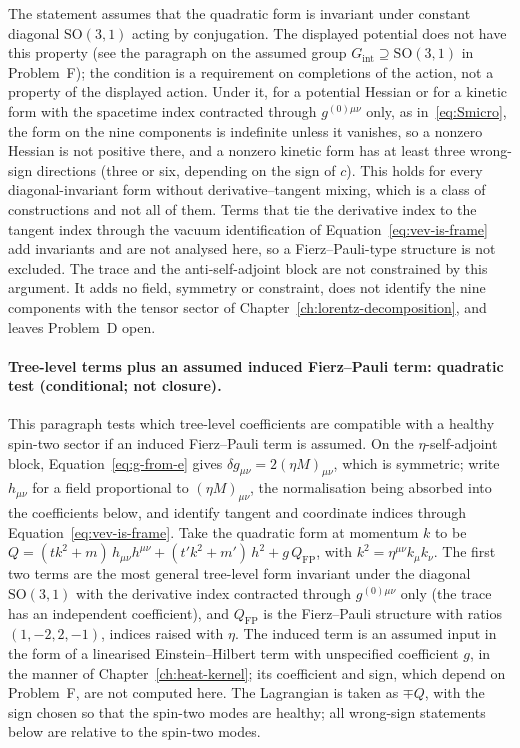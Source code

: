 The statement assumes that the quadratic form is invariant under constant
diagonal \(\mathrm{SO}(3,1)\) acting by conjugation.  The displayed
potential does not have this property (see the paragraph on the assumed
group \(G_{\mathrm{int}}\supseteq\mathrm{SO}(3,1)\) in Problem~F); the
condition is a requirement on completions of the action, not a property of
the displayed action.  Under it, for a potential Hessian or for a kinetic
form with the spacetime index contracted through \(g^{(0)\mu\nu}\) only, as
in~\eqref{eq:Smicro}, the form on the nine components is indefinite unless
it vanishes, so a nonzero Hessian is not positive there, and a nonzero
kinetic form has at least three wrong-sign directions (three or six,
depending on the sign of \(c\)).  This holds for every diagonal-invariant
form without derivative--tangent mixing, which is a class of constructions
and not all of them.  Terms that tie the derivative index to the tangent
index through the vacuum identification of Equation~\eqref{eq:vev-is-frame}
add invariants and are not analysed here, so a Fierz--Pauli-type structure
is not excluded.  The trace and the anti-self-adjoint block are not
constrained by this argument.  It adds no field, symmetry or constraint,
does not identify the nine components with the tensor sector of
Chapter~\ref{ch:lorentz-decomposition}, and leaves Problem~D open.

\paragraph{Tree-level terms plus an assumed induced Fierz--Pauli term:
quadratic test (conditional; not closure).}
This paragraph tests which tree-level coefficients are compatible with a
healthy spin-two sector if an induced Fierz--Pauli term is assumed.  On
the \(\eta\)-self-adjoint block, Equation~\eqref{eq:g-from-e} gives
\(\delta g_{\mu\nu}=2(\eta M)_{\mu\nu}\), which is symmetric; write
\(h_{\mu\nu}\) for a field proportional to \((\eta M)_{\mu\nu}\), the
normalisation being absorbed into the coefficients below, and identify
tangent and coordinate indices through Equation~\eqref{eq:vev-is-frame}.
Take the quadratic form at momentum \(k\) to be
\(Q=(tk^2+m)\,h_{\mu\nu}h^{\mu\nu}+(t'k^2+m')\,h^2+g\,Q_{\mathrm{FP}}\),
with \(k^2=\eta^{\mu\nu}k_\mu k_\nu\).  The first two terms are the most
general tree-level form invariant under the diagonal \(\mathrm{SO}(3,1)\)
with the derivative index contracted through \(g^{(0)\mu\nu}\) only (the
trace has an independent coefficient), and \(Q_{\mathrm{FP}}\) is the
Fierz--Pauli structure with ratios \((1,-2,2,-1)\), indices raised with
\(\eta\).  The induced term is an assumed input in the form of a
linearised Einstein--Hilbert term with unspecified coefficient \(g\), in
the manner of Chapter~\ref{ch:heat-kernel}; its coefficient and sign,
which depend on Problem~F, are not computed here.  The Lagrangian is
taken as \(\mp Q\), with the sign chosen so that the spin-two modes are
healthy; all wrong-sign statements below are relative to the spin-two
modes.

